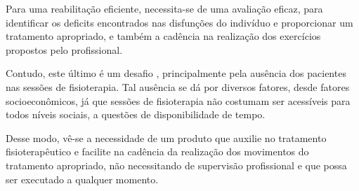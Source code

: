   Para uma reabilitação eficiente, necessita-se de uma avaliação eficaz,
 para identificar os deficits encontrados nas disfunções do indivíduo e proporcionar
  um tratamento apropriado, e também a cadência na realização dos exercícios propostos pelo
  profissional.

  Contudo, este último é um desafio , principalmente
  pela ausência dos pacientes nas sessões de fisioterapia. Tal ausência se dá por
  diversos fatores, desde fatores socioeconômicos, já que sessões de fisioterapia
  não costumam ser acessíveis para todos níveis sociais, a questões de disponibilidade de tempo.

  Desse modo, vê-se a necessidade de um produto que
   auxilie no tratamento fisioterapêutico e facilite na cadência
  da realização dos movimentos do tratamento apropriado, não necessitando de
  supervisão profissional e que possa ser executado a qualquer momento.


